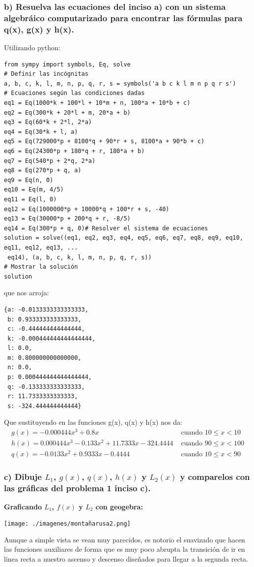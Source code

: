 \documentclass[11pt,letterpaper]{article}
\begin{document}
\subsubsection{b) Resuelva las ecuaciones del inciso a) con un sistema algebráico computarizado para encontrar las fórmulas para q(x), g(x) y h(x).}
Utilizando python:
\begin{verbatim}
from sympy import symbols, Eq, solve
# Definir las incógnitas
a, b, c, k, l, m, n, p, q, r, s = symbols('a b c k l m n p q r s')
# Ecuaciones según las condiciones dadas
eq1 = Eq(1000*k + 100*l + 10*m + n, 100*a + 10*b + c)
eq2 = Eq(300*k + 20*l + m, 20*a + b)
eq3 = Eq(60*k + 2*l, 2*a)
eq4 = Eq(30*k + l, a)
eq5 = Eq(729000*p + 8100*q + 90*r + s, 8100*a + 90*b + c)
eq6 = Eq(24300*p + 180*q + r, 180*a + b)
eq7 = Eq(540*p + 2*q, 2*a)
eq8 = Eq(270*p + q, a)
eq9 = Eq(n, 0)
eq10 = Eq(m, 4/5)
eq11 = Eq(l, 0)
eq12 = Eq(1000000*p + 10000*q + 100*r + s, -40)
eq13 = Eq(30000*p + 200*q + r, -8/5)
eq14 = Eq(300*p + q, 0)# Resolver el sistema de ecuaciones
solution = solve((eq1, eq2, eq3, eq4, eq5, eq6, eq7, eq8, eq9, eq10, eq11, eq12, eq13, ...
 eq14), (a, b, c, k, l, m, n, p, q, r, s))
# Mostrar la solución
solution
\end{verbatim}
que nos arroja:
\begin{verbatim}
{a: -0.0133333333333333,
 b: 0.933333333333333,
 c: -0.444444444444444,
 k: -0.000444444444444444,
 l: 0.0,
 m: 0.800000000000000,
 n: 0.0,
 p: 0.000444444444444444,
 q: -0.133333333333333,
 r: 11.7333333333333,
 s: -324.444444444444}
\end{verbatim}
Que sustituyendo en las funciones g(x), q(x) y h(x) nos da:
\begin{equation*}
  \begin{split}
    g(x)=-0.000444x^3+0.8x &\text{  cuando  } 10 \leq x < 10 \\
    h(x)=0.000444x^3-0.133x^2+11.7333x-324.4444 &\text{  cuando  } 90 \leq x < 100 \\
    q(x) = -0.0133x^2+0.9333x-0.4444 &\text{  cuando  } 10 \leq x < 90
  \end{split}
\end{equation*}
\subsubsection{c) Dibuje $L_1$, $g(x)$, $q(x)$, $h(x)$ y $L_2(x)$ y comparelos con las gráficas del problema 1 inciso c).}
\textbf{Graficando $L_1$, $f(x)$ y $L_2$ con geogebra:}
\begin{center}
  \texttt{[image: ./imagenes/montañarusa2.png]}
\end{center}
Aunque a simple vista se vean muy parecidos, es notorio el suavizado que hacen las funciones auxiliares de forma que es muy poco abrupta la transición de ir en linea recta a nuestro ascenso y descenso diseñados para llegar a la segunda recta.
\end{document}
